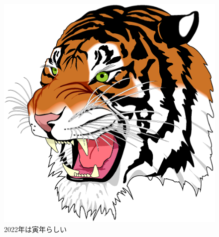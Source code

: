\documentclass[report]{jlreq}
\begin{document}
\begin{figure}
  \centering
  \includegraphics[width=\columnwidth,clip]{./tiger.eps}
  \caption{2022年は寅年らしい}
  \label{fig:tiger}
\end{figure}
\end{document}
